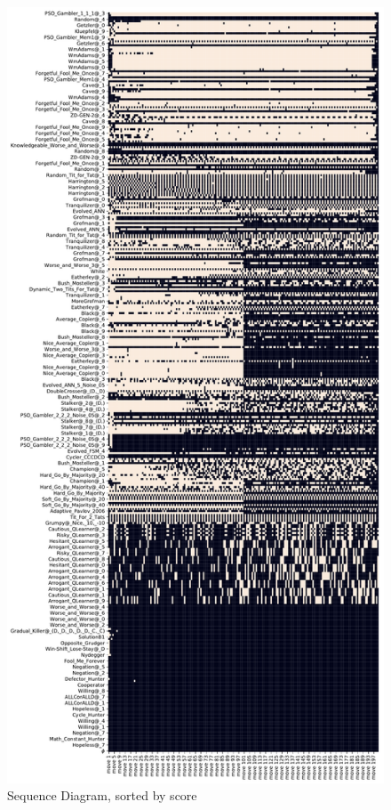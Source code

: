 \begin{figure}[ht]
\begin{minipage}{0.48\textwidth}
    \end{minipage}\hfill
    \begin{minipage}{0.48\textwidth}
        \includegraphics[width=1.0\textwidth, center]{./img/descriptive/sequence_plot_score_pt2.pdf}
    \end{minipage}
    \caption{Sequence Diagram, sorted by score}\label{fig:sequence_plot_score}
\end{figure}

